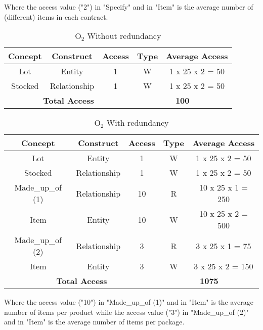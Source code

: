 Where the access value ("2") in "Specify" and in "Item" is the average number of (different) items in each contract.

\begin{table}[!h]\caption{	$ \textrm{O}_\textrm{2} $ Without redundancy}
	\begin{center}
		\begin{tabular}{| c | c | c | c | c |}
			\hline
			\textbf{Concept} & \textbf{Construct} & \textbf{Access} & \textbf{Type} & \textbf{Average Access} \\ \hline
			Lot & Entity & 1 & W & 1 x 25 x 2 = 50 \\ \hline
			Stocked & Relationship & 1 & W & 1 x 25 x 2 = 50 \\ \hline
			\multicolumn{3}{|c|}{\textbf{Total Access}} & \multicolumn{2}{|c|}{\textbf{100}} \\ \hline
		\end{tabular}
	\end{center}
\end{table}



\begin{table}[!h]\caption{	$ \textrm{O}_\textrm{2} $ With redundancy}
	\begin{center}
		\begin{tabular}{| c | c | c | c | c |}
			\hline
			\textbf{Concept} & \textbf{Construct} & \textbf{Access} & \textbf{Type} & \textbf{Average Access} \\ \hline
			Lot & Entity & 1 & W & 1 x 25 x 2 = 50 \\ \hline
			Stocked & Relationship & 1 & W & 1 x 25 x 2 = 50 \\ \hline
			Made\_up\_of (1) & Relationship & 10 & R & 10 x 25 x 1 = 250 \\ \hline
			Item & Entity & 10 & W & 10 x 25 x 2 = 500 \\ \hline
			Made\_up\_of (2) & Relationship & 3 & R & 3 x 25 x 1 = 75 \\ \hline
			Item & Entity & 3 & W & 3 x 25 x 2 = 150 \\ \hline
			\multicolumn{3}{|c|}{\textbf{Total Access}} & \multicolumn{2}{|c|}{\textbf{1075}} \\ \hline
		\end{tabular}
	\end{center}
\end{table}

Where the access value ("10") in "Made\_up\_of (1)" and in "Item" is the average number of items per product while the access value ("3") in "Made\_up\_of (2)" and in "Item" is the average number of items per package.

